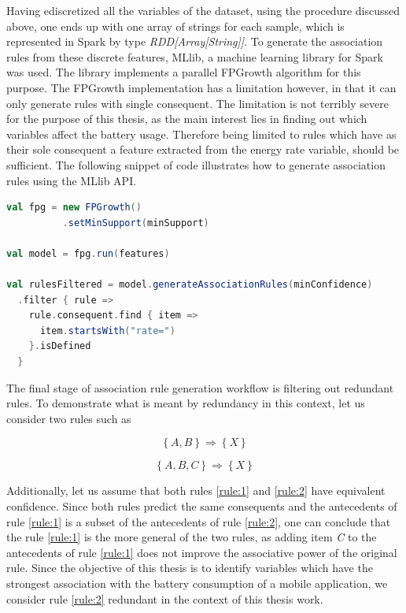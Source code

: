 Having ediscretized all the variables of the dataset, using the procedure discussed above, one ends up with one array of strings for each sample, which is represented in Spark by type \textit{RDD[Array[String]]}. To generate the association rules from these discrete features, MLlib, a machine learning library for Spark was used. The library implements a parallel FPGrowth algorithm for this purpose. The FPGrowth implementation has a limitation however, in that it can only generate rules with single consequent. The limitation is not terribly severe for the purpose of this thesis, as the main interest lies in finding out which variables affect the battery usage. Therefore being limited to rules which have as their sole consequent a feature extracted from the energy rate variable, should be sufficient. The following snippet of code illustrates how to generate association rules using the MLlib API.

\begin{minipage}{\linewidth}
\begin{lstlisting}[language=scala] 
val fpg = new FPGrowth()
		  .setMinSupport(minSupport)
			  
val model = fpg.run(features)

val rulesFiltered = model.generateAssociationRules(minConfidence)
  .filter { rule =>
    rule.consequent.find { item =>
	  item.startsWith("rate=")
	}.isDefined
  }
\end{lstlisting}
\end{minipage}       

The final stage of association rule generation workflow is filtering out redundant rules. To demonstrate what is meant by redundancy in this context, let us consider two rules such as    

\begin{equation}
	\left\{ A, B \right\}  \Rightarrow  \left\{ X \right\} \label{rule:1}
\end{equation}

\begin{equation}
\left\{ A, B, C \right\}  \Rightarrow  \left\{ X \right\} \label{rule:2}
\end{equation}

Additionally, let us assume that both rules \eqref{rule:1} and \eqref{rule:2} have equivalent confidence. Since both rules predict the same consequents and the antecedents of rule \eqref{rule:1} is a subset of the antecedents of rule \eqref{rule:2}, one can conclude that the rule \eqref{rule:1} is the more general of the two rules, as adding item \textit{C} to the antecedents of rule \eqref{rule:1} does not improve the associative power of the original rule. Since the objective of this thesis is to identify variables which have the strongest association with the battery consumption of a mobile application, we consider rule \eqref{rule:2} redundant in the context of this thesis work.

